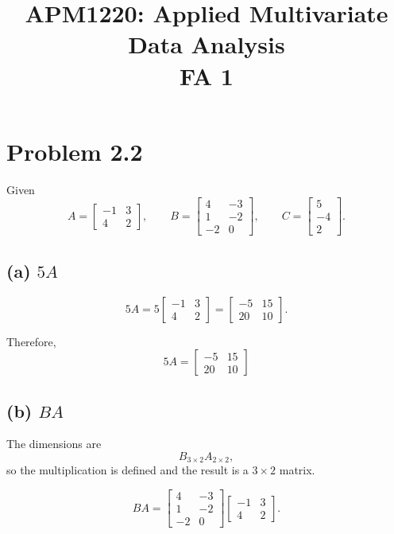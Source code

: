 \documentclass[12pt]{article}
\title{APM1220: Applied Multivariate Data Analysis\\FA 1}
\author{}
\date{}
\begin{document}
\maketitle

\section*{Problem 2.2}

Given
\[
A =
\begin{bmatrix}
-1 & 3 \\
4 & 2
\end{bmatrix},
\qquad
B =
\begin{bmatrix}
4 & -3 \\
1 & -2 \\
-2 & 0
\end{bmatrix},
\qquad
C =
\begin{bmatrix}
5 \\
-4 \\
2
\end{bmatrix}.
\]

\subsection*{(a) $5A$}

\[
5A
=
5
\begin{bmatrix}
-1 & 3 \\
4 & 2
\end{bmatrix}
=
\begin{bmatrix}
-5 & 15 \\
20 & 10
\end{bmatrix}.
\]

Therefore,
\[
\boxed{
5A =
\begin{bmatrix}
-5 & 15 \\
20 & 10
\end{bmatrix}
}
\]

\subsection*{(b) $BA$}

The dimensions are
\[
B_{3\times2}A_{2\times2},
\]
so the multiplication is defined and the result is a $3\times2$ matrix.

\[
BA
=
\begin{bmatrix}
4 & -3 \\
1 & -2 \\
-2 & 0
\end{bmatrix}
\begin{bmatrix}
-1 & 3 \\
4 & 2
\end{bmatrix}.
\]
\end{document}
